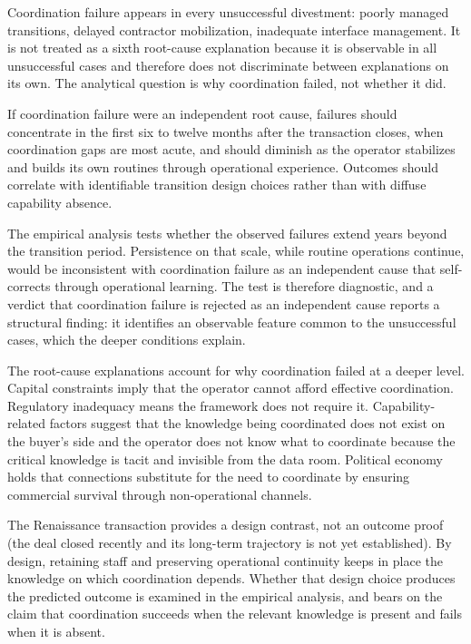 Coordination failure appears in every unsuccessful divestment: poorly
managed transitions, delayed contractor mobilization, inadequate
interface management. It is not treated as a sixth root-cause
explanation because it is observable in all unsuccessful cases and
therefore does not discriminate between explanations on its own. The
analytical question is why coordination failed, not whether it did.

If coordination failure were an independent root cause, failures should
concentrate in the first six to twelve months after the transaction
closes, when coordination gaps are most acute, and should diminish as
the operator stabilizes and builds its own routines through operational
experience. Outcomes should correlate with identifiable transition
design choices rather than with diffuse capability absence.

The empirical analysis tests whether the observed failures extend years
beyond the transition period. Persistence on that scale, while routine
operations continue, would be inconsistent with coordination failure as
an independent cause that self-corrects through operational learning.
The test is therefore diagnostic, and a verdict that coordination
failure is rejected as an independent cause reports a structural
finding: it identifies an observable feature common to the unsuccessful
cases, which the deeper conditions explain.

The root-cause explanations account for why coordination failed at a
deeper level. Capital constraints imply that the operator cannot afford
effective coordination. Regulatory inadequacy means the framework does
not require it. Capability-related factors suggest that the knowledge
being coordinated does not exist on the buyer's side and the operator
does not know what to coordinate because the critical knowledge is tacit
and invisible from the data room. Political economy holds that
connections substitute for the need to coordinate by ensuring commercial
survival through non-operational channels.

The Renaissance transaction provides a design contrast, not an outcome
proof (the deal closed recently and its long-term trajectory is not yet
established). By design, retaining staff and preserving operational
continuity keeps in place the knowledge on which coordination depends.
Whether that design choice produces the predicted outcome is examined in
the empirical analysis, and bears on the claim that coordination
succeeds when the relevant knowledge is present and fails when it is
absent.

